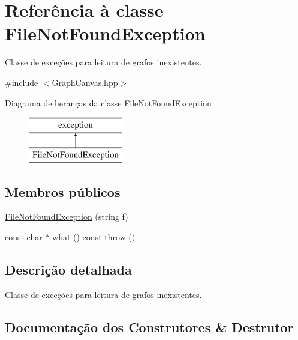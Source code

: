 \hypertarget{classFileNotFoundException}{}\section{Referência à classe File\+Not\+Found\+Exception}
\label{classFileNotFoundException}


Classe de exceções para leitura de grafos inexistentes.  




{\ttfamily \#include $<$Graph\+Canvas.\+hpp$>$}

Diagrama de heranças da classe File\+Not\+Found\+Exception\begin{figure}[H]
\begin{center}
\leavevmode
\includegraphics[height=2.000000cm]{classFileNotFoundException}
\end{center}
\end{figure}
\subsection*{Membros públicos}
\begin{DoxyCompactItemize}
\item 
\mbox{\hyperlink{classFileNotFoundException_a9d496f2fcb769c4ae3f2ba1bd5c4840c}{File\+Not\+Found\+Exception}} (string f)
\item 
const char $\ast$ \mbox{\hyperlink{classFileNotFoundException_a7b845599455543d92dffe50950f5fa8d}{what}} () const  throw ()
\end{DoxyCompactItemize}


\subsection{Descrição detalhada}
Classe de exceções para leitura de grafos inexistentes. 

\subsection{Documentação dos Construtores \& Destrutor}
\mbox{\label{classFileNotFoundException_a9d496f2fcb769c4ae3f2ba1bd5c4840c}} 
